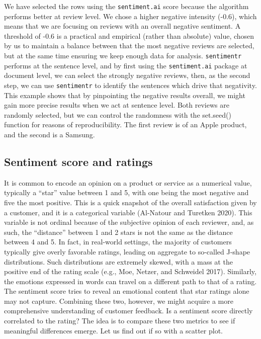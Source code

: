 We have selected the rows using the \texttt{sentiment.ai} score because the
algorithm performs better at review level. We chose a higher
negative intensity (-0.6), which means that we are focusing on reviews with an overall negative sentiment. A threshold of
-0.6 is a practical and empirical (rather than absolute) value, chosen by
us to maintain a balance between that the most negative reviews are
selected, but at the same time ensuring we keep enough data for analysis.
\texttt{sentimentr} performs at the sentence level, and by first using the
\texttt{sentiment.ai} package at document level, we can select the
strongly negative reviews, then, as the second step, we can use
\texttt{sentimentr} to identify the sentences which drive that
negativity. This example shows that by pinpointing the negative
results overall, we might gain more precise results when we act at
sentence level. Both reviews are randomly selected, but we can control the
randomness with the set.seed() function for reasons of reproducibility. The
first review is of an Apple product, and the second is a Samsung.

\subsection{Sentiment score and
ratings}\label{sentiment-score-and-ratings}

It is common to encode an opinion on a product
or service as a numerical value, typically a ``star'' value between 1
and 5, with one being the most negative and five the most positive. This is a quick snapshot of the overall satisfaction given by
a customer, and it is a categorical variable (Al-Natour and Turetken
2020). This variable is not ordinal because of the
subjective opinion of each reviewer, and, as such, the
``distance'' between 1 and 2 stars is not the same as the distance
between 4 and 5. In fact, in
real-world settings, the majority of customers typically give
overly favorable ratings, leading on aggregate to so-called J-shape
distributions. Such distributions are extremely skewed, with a
mass at the positive end of the rating scale (e.g., Moe, Netzer, and
Schweidel 2017). Similarly, the emotions expressed in words can travel
on a different path to that of a rating. The sentiment score tries to reveal an emotional content that
star ratings alone may not capture. Combining these two, however, we
might acquire a more comprehensive understanding of customer feedback. Is a
sentiment score directly correlated to the rating? The idea is to
compare these two metrics to see if meaningful differences emerge. Let
us find out if so with a scatter plot.

